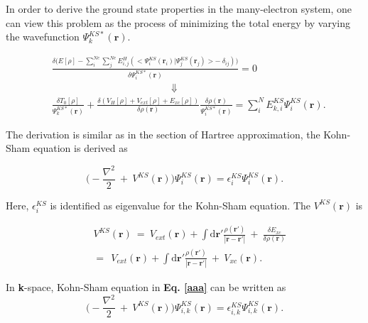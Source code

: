 \documentclass[a4paper, 12pt, titlepage,oneside,drop]{kthesis}
\begin{document}
In order to derive the ground state properties in the many-electron system, one can view this problem as the process of minimizing the total energy by varying the wavefunction $\Psi^{{KS}*}_{{k}}(\textbf{r})$. 

\begin{equation}\begin{split}\label{ks11}
& \frac{ \delta  \Big(E[\rho] - \sum\limits_{i}^{Ne} \sum\limits_{j}^{Ne} E_{i,j}^{H} (<\Psi^{{KS}}_{{i}}(\textbf{r}_i) | \Psi^{{KS}}_{{j}}(\textbf{r}_j)> -\ \delta_{ij})\Big)}{\delta \Psi^{{KS}*}_{{i}}(\textbf{r})}  = 0 \\
&  \qquad \qquad \qquad  \qquad \qquad \qquad  \Downarrow \\
& \frac{\delta T_{0}[\rho]}{\Psi^{{KS}*}_{{k}}(\textbf{r})} + \frac{\delta(V_{H}[\rho]  + V_{ext}[\rho] + E_{xc}[\rho])}{\delta \rho(\textbf{r})} \frac{\delta \rho(\textbf{r})}{\Psi^{{KS}*}_{{i}}(\textbf{r})} 
= \sum\limits_i^{{N}} E_{k,i}^{KS} \Psi^{{KS}}_{{i}}(\textbf{r}).
\end{split}
\end{equation}


The derivation is similar as in the section of Hartree approximation, the Kohn-Sham equation is derived as 

\begin{equation}\label{aaa}
 \Big(-\frac{\nabla^{2}}{2}\ + \ V^{KS}(\textbf{r})\Big) \Psi^{{KS}}_{{i}}(\textbf{r}) = \epsilon^{{KS}}_{{i}} \Psi^{{KS}}_{{i}}(\textbf{r}).
\end{equation}

Here, $\epsilon^{{KS}}_{{i}}$ is identified as eigenvalue for the Kohn-Sham equation. The $V^{KS}(\textbf{r})$ is 

\begin{equation}\begin{split}\label{xiahunao}
&\ V^{KS}(\textbf{r}) \ = \ V_{ext}(\textbf{r}) + \int \mathrm{d}{\textbf{r}'}  \frac{\rho(\textbf{r}')}{|{\textbf{r}}-{\textbf{r}}'|} \ + \ \frac{\delta{E_{xc}}}{\delta{\rho(\textbf{r})}} \\
&\ = \ \ V_{ext}(\textbf{r}) + \int \mathrm{d}{\textbf{r}'}  \frac{\rho(\textbf{r}')}{|{\textbf{r}}-{\textbf{r}}'|} \ + \ V_{xc}(\textbf{r}).
\end{split}
\end{equation}

In \textbf{k}-space, Kohn-Sham equation in \textbf{Eq. \ref{aaa}} can be written as
\begin{equation}\label{aaa111}
 \Big(-\frac{\nabla^{2}}{2}\ + \ V^{KS}(\textbf{r})\Big) \Psi^{{KS}}_{{i,k}}(\textbf{r}) = \epsilon^{{KS}}_{{i,k}} \Psi^{{KS}}_{{i,k}}(\textbf{r}).
\end{equation}
\end{document}
